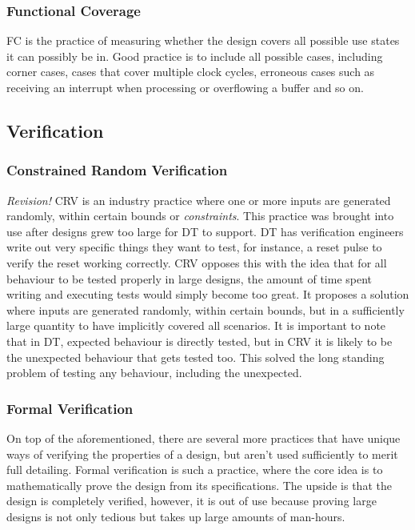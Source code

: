 \documentclass[11pt,british]{article}
\begin{document}
\subsubsection{Functional Coverage}
\gls{FC} is the practice of measuring whether the design covers all possible use states it can possibly be in. Good practice is to include all possible cases, including corner cases, cases that cover multiple clock cycles, erroneous cases such as receiving an interrupt when processing or overflowing a buffer and so on. 

\subsection{Verification}

\subsubsection{Constrained Random Verification}
\emph{\color{red}Revision!}
\gls{CRV} is an industry practice where one or more inputs are generated randomly, within certain bounds or \emph{constraints}. This practice was brought into use after designs grew too large for \gls{DT} to support. DT has verification engineers write out very specific things they want to test, for instance, a reset pulse to verify the reset working correctly. CRV opposes this with the idea that for all behaviour to be tested properly in large designs, the amount of time spent writing and executing tests would simply become too great. It proposes a solution where inputs are generated randomly, within certain bounds, but in a sufficiently large quantity to have implicitly covered all scenarios. It is important to note that in DT, expected behaviour is directly tested, but in CRV it is likely to be the unexpected behaviour that gets tested too. This solved the long standing problem of testing any behaviour, including the unexpected.

\subsubsection{Formal Verification}
On top of the aforementioned, there are several more practices that have unique ways of verifying the properties of a design, but aren't used sufficiently to merit full detailing. Formal verification is such a practice, where the core idea is to mathematically prove the design from its specifications. The upside is that the design is completely verified, however, it is out of use because proving large designs is not only tedious but takes up large amounts of man-hours.
\end{document}
